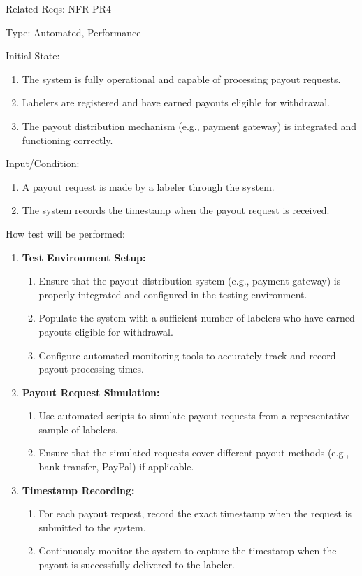 \documentclass[12pt, titlepage]{article}
\begin{document}
\begin{enumerate}
Related Reqs: NFR-PR4

Type: Automated, Performance

Initial State: 

\begin{enumerate}
    \item The system is fully operational and capable of processing payout requests.
    \item Labelers are registered and have earned payouts eligible for withdrawal.
    \item The payout distribution mechanism (e.g., payment gateway) is integrated and functioning correctly.
\end{enumerate}
Input/Condition: 
\begin{enumerate}
    \item A payout request is made by a labeler through the system.
    \item The system records the timestamp when the payout request is received.
\end{enumerate}
How test will be performed:
\begin{enumerate}
    \item \textbf{Test Environment Setup:}
    \begin{enumerate}
        \item Ensure that the payout distribution system (e.g., payment gateway) is properly integrated and configured in the testing environment.
        \item Populate the system with a sufficient number of labelers who have earned payouts eligible for withdrawal.
        \item Configure automated monitoring tools to accurately track and record payout processing times.
    \end{enumerate}
    
    \item \textbf{Payout Request Simulation:}
    \begin{enumerate}
        \item Use automated scripts to simulate payout requests from a representative sample of labelers.
        \item Ensure that the simulated requests cover different payout methods (e.g., bank transfer, PayPal) if applicable.
    \end{enumerate}
    
    \item \textbf{Timestamp Recording:}
    \begin{enumerate}
        \item For each payout request, record the exact timestamp when the request is submitted to the system.
        \item Continuously monitor the system to capture the timestamp when the payout is successfully delivered to the labeler.
    \end{enumerate}
    

\end{enumerate}
\end{enumerate}
\end{document}
